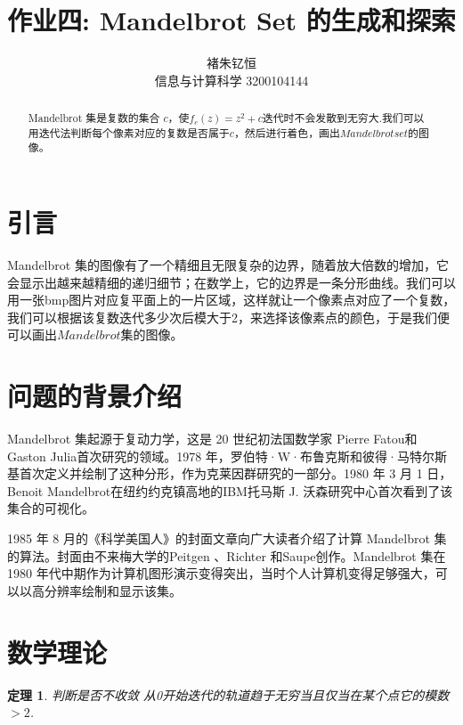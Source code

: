 \documentclass{article}
\title{作业四: Mandelbrot Set 的生成和探索}
\author{褚朱钇恒 \\ 信息与计算科学 3200104144}
\newtheorem{theorem}{定理}
\begin{document}
\maketitle

\begin{abstract}
     Mandelbrot 集是复数的集合 $c$，使$f_{c}(z)=z^{2}+c$迭代时不会发散到无穷大.我们可以用迭代法判断每个像素对应的复数是否属于$c$，然后进行着色，画出$Mandelbrot set$的图像。
\end{abstract}
\section{引言}
Mandelbrot 集的图像有了一个精细且无限复杂的边界，随着放大倍数的增加，它会显示出越来越精细的递归细节；在数学上，它的边界是一条分形曲线。我们可以用一张bmp图片对应复平面上的一片区域，这样就让一个像素点对应了一个复数，我们可以根据该复数迭代多少次后模大于2，来选择该像素点的颜色，于是我们便可以画出$Mandelbrot$集的图像。
\section{问题的背景介绍}
Mandelbrot 集起源于复动力学，这是 20 世纪初法国数学家 Pierre Fatou和Gaston Julia首次研究的领域。1978 年，罗伯特·W·布鲁克斯和彼得·马特尔斯基首次定义并绘制了这种分形，作为克莱因群研究的一部分。1980 年 3 月 1 日，Benoit Mandelbrot在纽约约克镇高地的IBM托马斯 J. 沃森研究中心首次看到了该集合的可视化。

1985 年 8 月的《科学美国人》的封面文章向广大读者介绍了计算 Mandelbrot 集的算法。封面由不来梅大学的Peitgen 、Richter 和Saupe创作。Mandelbrot 集在 1980 年代中期作为计算机图形演示变得突出，当时个人计算机变得足够强大，可以以高分辨率绘制和显示该集。\cite{wikipedia_Mandelbrot}

\section{数学理论}
\begin{theorem}{判断是否不收敛}
     从0开始迭代的轨道趋于无穷当且仅当在某个点它的模数$>2$.
\end{theorem}
\end{document}
